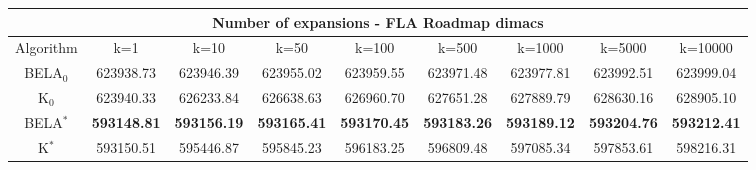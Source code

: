 \begin{tabular}{c|cccccccc}\toprule
\multicolumn{9}{c}{Number of expansions - FLA Roadmap dimacs}\\ \midrule
Algorithm & k=1 & k=10 & k=50 & k=100 & k=500 & k=1000 & k=5000 & k=10000 \\ \midrule
BELA$_0$ & 623938.73 & 623946.39 & 623955.02 & 623959.55 & 623971.48 & 623977.81 & 623992.51 & 623999.04 \\
K$_0$ & 623940.33 & 626233.84 & 626638.63 & 626960.70 & 627651.28 & 627889.79 & 628630.16 & 628905.10 \\
BELA$^*$ & \textbf{593148.81} & \textbf{593156.19} & \textbf{593165.41} & \textbf{593170.45} & \textbf{593183.26} & \textbf{593189.12} & \textbf{593204.76} & \textbf{593212.41} \\
K$^*$ & 593150.51 & 595446.87 & 595845.23 & 596183.25 & 596809.48 & 597085.34 & 597853.61 & 598216.31 \\ \bottomrule 
\end{tabular}
